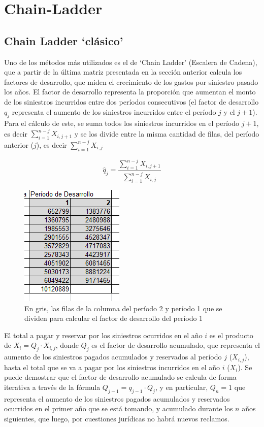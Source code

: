 \documentclass[
  12pt,
]{article}
\begin{document}
\hypertarget{chain-ladder}{%
\section{Chain-Ladder}\label{chain-ladder}}

\hypertarget{chain-ladder-cluxe1sico}{%
\subsection{Chain Ladder `clásico'}\label{chain-ladder-cluxe1sico}}

Uno de los métodos más utilizados es el de `Chain Ladder' (Escalera de
Cadena), que a partir de la última matriz presentada en la sección
anterior calcula los factores de desarrollo, que miden el crecimiento de
los gastos por siniestro pasado los años. El factor de desarrollo
representa la proporción que aumentan el monto de los siniestros
incurridos entre dos períodos consecutivos (el factor de desarrollo
\(q_j\) representa el aumento de los siniestros incurridos entre el
período \(j\) y el \(j+1\)). Para el cálculo de este, se suma todos los
siniestros incurridos en el período \(j+1\), es decir
\(\sum_{i=1}^{n-j} X_{i,j+1}\) y se los divide entre la misma cantidad
de filas, del período anterior (\(j\)), es decir
\(\sum_{i=1}^{n-j} X_{i,j}\)

\[
\hat{q}_{j} = \frac{\sum_{i=1}^{n-j} X_{i,j+1}}{\sum_{i=1}^{n-j} X_{i,j}}
\]

\begin{figure}
\centering
\includegraphics{imagenes/captura1.jpg}
\caption{En gris, las filas de la columna del período 2 y período 1 que
se dividen para calcular el factor de desarrollo del período 1}
\end{figure}

El total a pagar y reservar por los siniestros ocurridos en el año \(i\)
es el producto de \(X_i = Q_j\cdot X_{i,j}\), donde \(Q_j\) es el factor
de desarrollo acumulado, que representa el aumento de los siniestros
pagados acumulados y reservados al período \(j\) (\(X_{i,j}\)), hasta el
total que se va a pagar por los siniestros incurridos en el año \(i\)
(\(X_i\)). Se puede demostrar que el factor de desarrollo acumulado se
calcula de forma iterativa a través de la fórmula
\(Q_{j-1}=q_{j-1}\cdot Q_{j}\), y en particular, \(Q_n = 1\) que
representa el aumento de los siniestros pagados acumulados y reservados
ocurridos en el primer año que se está tomando, y acumulado durante los
\(n\) años siguientes, que luego, por cuestiones jurídicas no habrá
nuevos reclamos.
\end{document}
